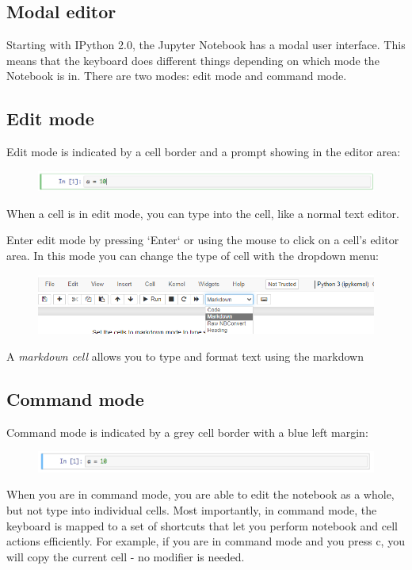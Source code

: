 \subsection{Modal editor}
Starting with IPython 2.0, the Jupyter Notebook has a modal user interface. This means that the keyboard does different things depending on which mode the Notebook is in. There are two modes: edit mode and command mode.

\subsection{Edit mode}
Edit mode is indicated by a cell border and a prompt showing in the editor area:

\begin{figure}
    \centering
    \includegraphics[width=0.5\linewidth]{edit_mode.png}
\end{figure}

When a cell is in edit mode, you can type into the cell, like a normal text editor.

Enter edit mode by pressing `Enter` or using the mouse to click on a cell's editor area.
In this mode you can change the type of cell with the dropdown menu:  
\begin{figure}
    \centering
    \includegraphics[width=0.5\linewidth]{celltype.png}
\end{figure}

A \emph{markdown cell} allows you to type and format text using the markdown 


\subsection{Command mode}
Command mode is indicated by a grey cell border with a blue left margin:

\begin{figure}
    \centering
    \includegraphics[width=0.5\linewidth]{command_mode.png}
\end{figure}

When you are in command mode, you are able to edit the notebook as a whole, but not type into individual cells. Most importantly, in command mode, the keyboard is mapped to a set of shortcuts that let you perform notebook and cell actions efficiently. For example, if you are in command mode and you press c, you will copy the current cell - no modifier is needed.

